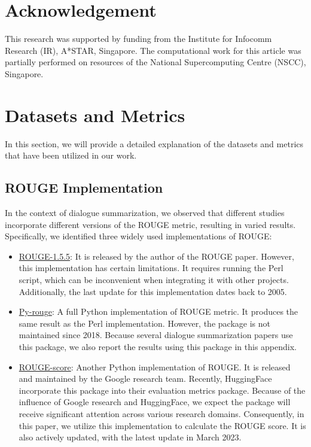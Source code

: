 \documentclass[11pt]{article}
\begin{document}
\section*{Acknowledgement}

    This research was supported by funding from the Institute for Infocomm Research (IR), A*STAR, Singapore. The computational work for this article was partially performed on resources of the National Supercomputing Centre (NSCC), Singapore.





\appendix

\section{Datasets and Metrics}

    In this section, we will provide a detailed explanation of the datasets and metrics that have been utilized in our work.
    
    \subsection{ROUGE Implementation}
    \label{sec:rouge_implementation}

    In the context of dialogue summarization, we observed that different studies incorporate different versions of the ROUGE metric, resulting in varied results. Specifically, we identified three widely used implementations of ROUGE:
    
        \begin{itemize}
            \item \href{https://github.com/andersjo/pyrouge/blob/master/tools/ROUGE-1.5.5/ROUGE-1.5.5.pl}{ROUGE-1.5.5}: It is released by the author of the ROUGE paper. However, this implementation has certain limitations. It requires running the Perl script, which can be inconvenient when integrating it with other projects. Additionally, the last update for this implementation dates back to 2005.
            \item \href{https://pypi.org/project/py-rouge/}{Py-rouge}: A full Python implementation of ROUGE metric. It produces the same result as the Perl implementation. However, the package is not maintained since 2018. Because several dialogue summarization papers use this package, we also report the results using this package in this appendix.
            \item \href{https://github.com/google-research/google-research/tree/master/rouge}{ROUGE-score}: Another Python implementation of ROUGE. It is released and maintained by the Google research team. Recently, HuggingFace incorporate this package into their evaluation metrics package. Because of the influence of Google research and HuggingFace, we expect the package will receive significant attention across various research domains. Consequently, in this paper, we utilize this implementation to calculate the ROUGE score. It is also actively updated, with the latest update in March 2023.
        \end{itemize}
        
\end{document}

